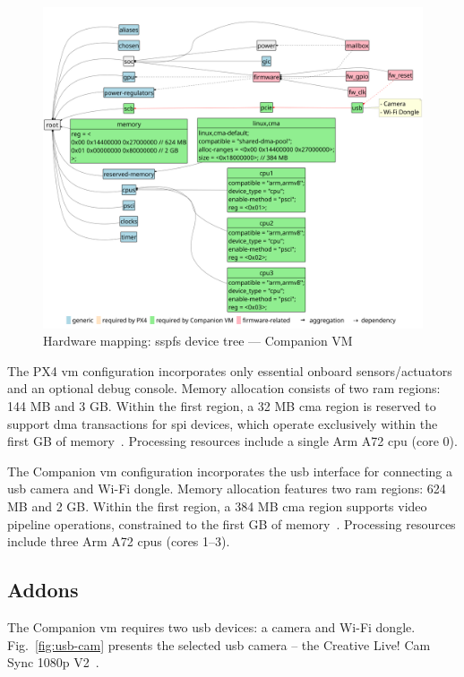 \begin{figure}[!hbt]
  \centering
  \includegraphics[width=1.0\textwidth]{./img/pdf/hw-map-3} 
  \caption[Hardware mapping: SSPFS device tree --- Companion VM]{Hardware
    mapping: \gls{sspfs} device tree --- Companion VM}%
  \label{fig:hw-map-3}
\end{figure}

The PX4 \gls{vm} configuration incorporates only essential onboard
sensors/actuators and an optional debug console. Memory allocation consists of
two \gls{ram} regions: 144 MB and 3 GB. Within the first region, a 32 MB
\gls{cma} region is reserved to support \gls{dma} transactions for \gls{spi}
devices, which operate exclusively within the first GB of
memory~\cite{bcm2711peripherals}. Processing resources include a single Arm A72
\gls{cpu} (core 0).

The Companion \gls{vm} configuration incorporates the \gls{usb} interface for
connecting a \gls{usb} camera and Wi-Fi dongle. Memory allocation features two
\gls{ram} regions: 624 MB and 2 GB. Within the first region, a 384 MB
\gls{cma} region supports video pipeline operations, constrained to the first GB
of memory~\cite{bcm2711peripherals}. Processing resources include three Arm A72
\glspl{cpu} (cores 1--3).

\subsection{Addons}
\label{sec:addons}
The Companion \gls{vm} requires two \gls{usb} devices: a camera and Wi-Fi
dongle. Fig.~\ref{fig:usb-cam} presents the selected \gls{usb} camera -- the
Creative Live! Cam Sync 1080p V2~\cite{creative-cam}.

